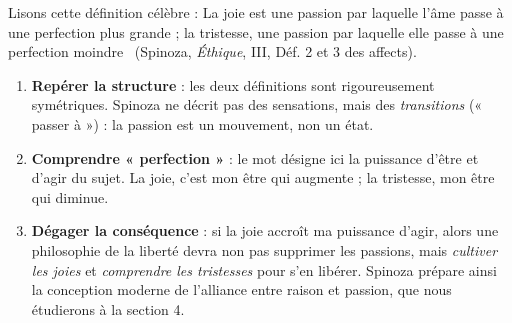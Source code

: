 \documentclass[11pt]{article}
\begin{document}
\begin{experience}
Lisons cette définition célèbre : \guillemotleft La joie est une passion par laquelle l'âme passe à une perfection plus grande ; la tristesse, une passion par laquelle elle passe à une perfection moindre \guillemotright\ (Spinoza, \emph{Éthique}, III, Déf. 2 et 3 des affects).
\begin{enumerate}
\item \textbf{Repérer la structure} : les deux définitions sont rigoureusement symétriques. Spinoza ne décrit pas des sensations, mais des \emph{transitions} (« passer à ») : la passion est un mouvement, non un état.
\item \textbf{Comprendre « perfection »} : le mot désigne ici la puissance d'être et d'agir du sujet. La joie, c'est mon être qui augmente ; la tristesse, mon être qui diminue.
\item \textbf{Dégager la conséquence} : si la joie accroît ma puissance d'agir, alors une philosophie de la liberté devra non pas supprimer les passions, mais \emph{cultiver les joies} et \emph{comprendre les tristesses} pour s'en libérer. Spinoza prépare ainsi la conception moderne de l'alliance entre raison et passion, que nous étudierons à la section 4.
\end{enumerate}
\end{experience}
\end{document}
